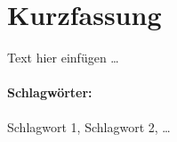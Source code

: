 \documentclass[../bachelor_paper.tex]{subfiles}
\begin{document}
\section*{Kurzfassung}\thispagestyle{empty}
    \label{chap:kurzfassung}

    Text hier einfügen \dots
    
    \vfill
\paragraph*{Schlagwörter:} Schlagwort 1, Schlagwort 2, \dots
{}
\end{document}
